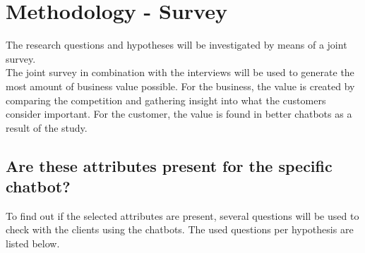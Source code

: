 \section{Methodology - Survey}
The research questions and hypotheses will be investigated by means of a joint survey.\\
\break
The joint survey in combination with the interviews will be used to generate the most amount of business value possible. For the business, the value is created by comparing the competition and gathering insight into what the customers consider important. For the customer, the value is found in better chatbots as a result of the study.\\

\subsection{Are these attributes present for the specific chatbot?}
To find out if the selected attributes are present, several questions will be used to check with the clients using the chatbots. The used questions per hypothesis are listed below.
